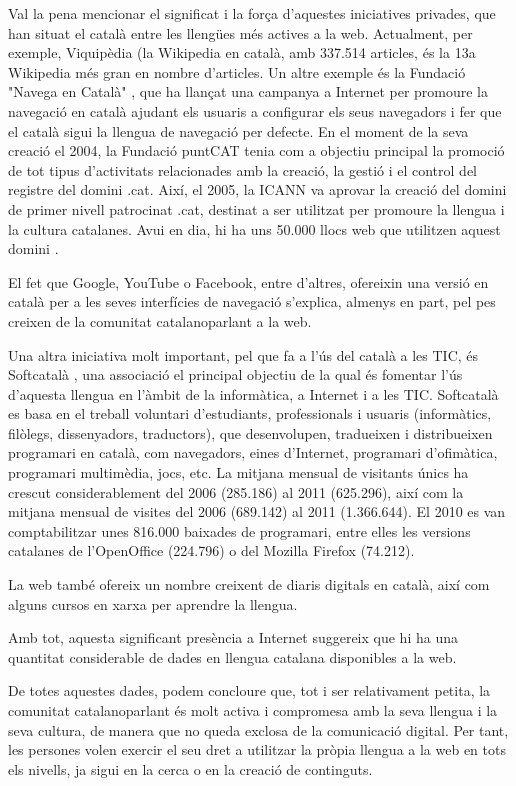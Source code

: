 \documentclass[]{../../metanetpaper}
\begin{document}
\begin{multicols}{2}
Val la pena mencionar el significat i la força d’aquestes iniciatives privades, que han situat el català entre les llengües més actives a la web. Actualment, per exemple, Viquipèdia (la Wikipedia en català, amb 337.514 articles, és la 13a Wikipedia més gran en nombre d’articles. Un altre exemple és la Fundació "Navega en Català" \cite{CAT-Nota19}, que ha llançat una campanya a Internet per promoure la navegació en català ajudant els usuaris a configurar els seus navegadors i fer que el català sigui la llengua de navegació per defecte. En el moment de la seva creació el 2004, la Fundació puntCAT tenia com a objectiu principal la promoció de tot tipus d’activitats relacionades amb la creació, la gestió i el control del registre del domini .cat. Així, el 2005, la ICANN va aprovar la creació del domini de primer nivell patrocinat .cat, destinat a ser utilitzat per promoure la llengua i la cultura catalanes. Avui en dia, hi ha uns 50.000 llocs web que utilitzen aquest domini \cite{CAT-Nota20}.

El fet que Google, YouTube o Facebook, entre d’altres, ofereixin una versió en català per a les seves interfícies de navegació s’explica, almenys en part, pel pes creixen de la comunitat catalanoparlant a la web.

Una altra iniciativa molt important, pel que fa a l’ús del català a les TIC, és Softcatalà \cite{CAT-Nota21}, una associació el principal objectiu de la qual és fomentar l’ús d’aquesta llengua en l’àmbit de la informàtica, a Internet i a les TIC. Softcatalà es basa en el treball voluntari d’estudiants, professionals i usuaris (informàtics, filòlegs, dissenyadors, traductors), que desenvolupen, tradueixen i distribueixen programari en català, com navegadors, eines d’Internet, programari d’ofimàtica, programari multimèdia, jocs, etc. La mitjana mensual de visitants únics ha crescut considerablement del 2006 (285.186) al 2011 (625.296), així com la mitjana mensual de visites del 2006  (689.142) al 2011 (1.366.644). El 2010 es van comptabilitzar unes 816.000 baixades de programari, entre elles les versions catalanes de l’OpenOffice (224.796) o del Mozilla Firefox (74.212).

La web també ofereix un nombre creixent de diaris digitals en català, així com alguns cursos en xarxa per aprendre la llengua.

Amb tot, aquesta significant presència a Internet suggereix que hi ha una quantitat considerable de dades en llengua catalana disponibles a la web.  

De totes aquestes dades, podem concloure que, tot i ser relativament petita, la comunitat catalanoparlant és molt activa i compromesa amb la seva llengua i la seva cultura, de manera que no queda exclosa de la comunicació digital. Per tant, les persones volen exercir el seu dret a utilitzar la pròpia llengua a la web en tots els nivells, ja sigui en la cerca o en la creació de continguts. 

\end{multicols}
\end{document}
